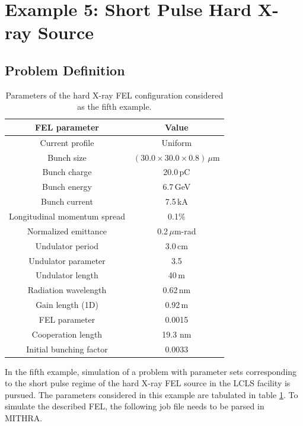 \section{Example 5: Short Pulse Hard X-ray Source}

\subsection{Problem Definition}

\begin{table}
	\label{example5}
	\caption{Parameters of the hard X-ray FEL configuration considered as the fifth example.}
	\centering
	{\footnotesize
	\begin{tabular}{|c||c|}
		\hline
		FEL parameter & Value \\ \hline \hline
		Current profile & Uniform \\ \hline
		Bunch size & $(30.0\times30.0\times0.8)\,\mu$m \\ \hline
		Bunch charge & 20.0\,pC \\ \hline
		Bunch energy & 6.7\,GeV \\	\hline
		Bunch current & 7.5\,kA \\ \hline
		Longitudinal momentum spread & 0.1\% \\ \hline
		Normalized emittance & 0.2\,$\mu$m-rad \\	\hline
		Undulator period & 3.0\,cm \\ \hline
		Undulator parameter & 3.5 \\ \hline
		Undulator length & 40\,m \\ \hline
		Radiation wavelength & 0.62\,nm \\ \hline
		Gain length (1D) & 0.92\,m \\ \hline
		FEL parameter & 0.0015 \\ \hline
		Cooperation length & 19.3 nm \\ \hline
		Initial bunching factor & $0.0033$ \\ \hline
	\end{tabular}
	}	
\end{table}
%
In the fifth example, simulation of a problem with parameter sets corresponding to the short pulse regime of the hard X-ray FEL source in the LCLS facility is pursued.
%
The parameters considered in this example are tabulated in table \ref{example5}.
%
To simulate the described FEL, the following job file needs to be parsed in MITHRA.
%
